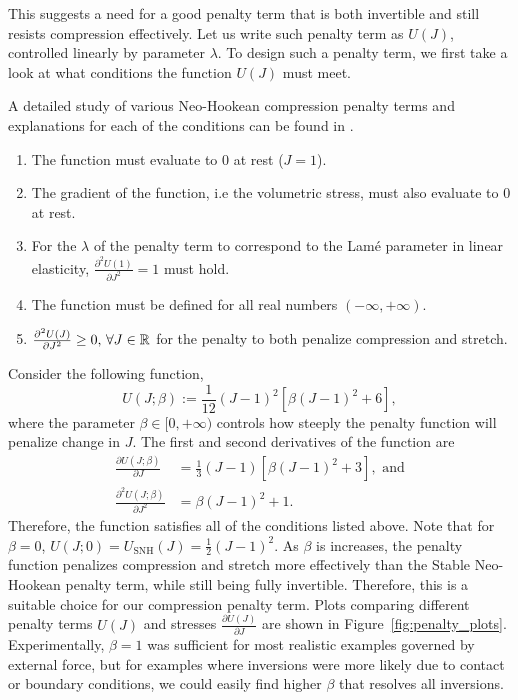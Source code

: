 This suggests a need for a good penalty term that is both invertible and still resists compression
effectively. Let us write such penalty term as $U(J)$, controlled linearly by parameter $\lambda$.
To design such a penalty term, we first take a look at what conditions the function $U(J)$ must
meet. 

A detailed study of various Neo-Hookean compression penalty terms and explanations for each of the 
conditions can be found in \cite{hartmann:2003}.

\begin{enumerate}[label=\alph*)]
	\item The function must evaluate to 0 at rest ($J = 1$).
	\item The gradient of the function, i.e the volumetric stress, must also evaluate to 0 at rest.
	\item For the $\lambda$ of the penalty term to  correspond to the Lam\'e parameter in linear elasticity, $\frac{\partial^2 U(1)}{\partial J^2} = 1$ must hold.
	\item The function must be defined for all real numbers $(-\infty, +\infty)$.
	\item $\frac{\partial^2 U(J)}{\partial J^2} \geq 0, \,\forall J \in \mathbb{R}$ for the penalty to both penalize compression and stretch.
\end{enumerate}

Consider the following function,
\begin{equation}
U(J; \beta) := \frac{1}{12} (J-1)^2 \left[ \beta (J-1)^2 + 6 \right],
\label{eq:penalty_function}
\end{equation}
where the parameter $\beta \in [0, +\infty)$ controls how steeply the penalty function will penalize change in $J$. 
The first and second derivatives of the function are 
\begin{align}
\frac{\partial U(J; \beta)}{\partial J} &= \frac{1}{3} (J-1) \left[ \beta (J-1)^2 + 3 \right], \text{ and}\\
\frac{\partial^2 U(J; \beta)}{\partial J^2} &= \beta (J-1)^2 + 1. 
\label{eq:penalty_derivatives}
\end{align}
Therefore, the function satisfies all of the conditions listed above.    
Note that for $\beta = 0$, $U(J;0) = U_{\text{SNH}}(J) = \frac{1}{2} (J-1)^2$. 
As $\beta$ is increases, the penalty function penalizes compression and stretch more effectively than the Stable
Neo-Hookean penalty term, while still being fully invertible. 
Therefore, this is a suitable choice for our compression penalty term.
Plots comparing different penalty terms $U(J)$ and stresses $\frac{\partial U(J)}{\partial J}$ are shown in Figure~\ref{fig:penalty_plots}.
Experimentally, $\beta = 1$ was sufficient for most realistic examples governed by external force, but for examples where inversions were more likely due to contact or boundary conditions, we could easily find higher $\beta$ that resolves all inversions.

